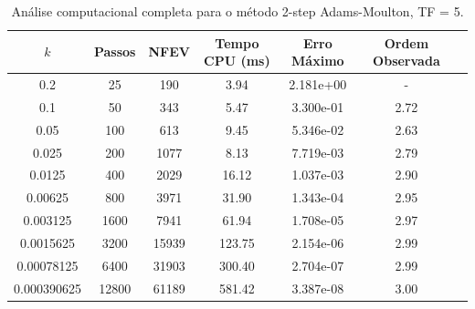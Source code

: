 \begin{table}[H]
    \centering
    \begin{tabular}{ccccccc}
        \hline
        $k$ & Passos & NFEV & Tempo CPU (ms) & Erro Máximo & Ordem Observada \\
        \hline
        0.2 & 25 & 190 & 3.94  & 2.181e+00 & - \\
        0.1 & 50 & 343 & 5.47  & 3.300e-01 & 2.72 \\
        0.05 & 100 & 613 & 9.45  & 5.346e-02 & 2.63 \\
        0.025 & 200 & 1077 & 8.13  & 7.719e-03 & 2.79 \\
        0.0125 & 400 & 2029 & 16.12  & 1.037e-03 & 2.90 \\
        0.00625 & 800 & 3971 & 31.90  & 1.343e-04 & 2.95 \\
        0.003125 & 1600 & 7941 & 61.94  & 1.708e-05 & 2.97 \\
        0.0015625 & 3200 & 15939 & 123.75  & 2.154e-06 & 2.99 \\
        0.00078125 & 6400 & 31903 & 300.40  & 2.704e-07 & 2.99 \\
        0.000390625 & 12800 & 61189 & 581.42  & 3.387e-08 & 3.00 \\
        \hline
    \end{tabular}
    \caption{Análise computacional completa para o método 2-step Adams-Moulton, TF = 5.}
    \label{tab:erros_2-step_adams-moulton,_tf_=_5}
\end{table}
